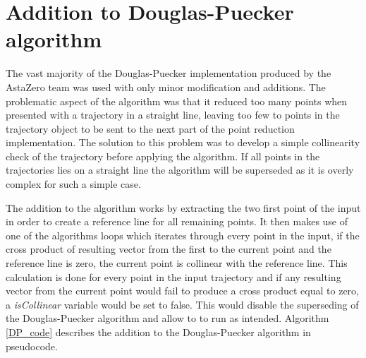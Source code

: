 \section{Addition to Douglas-Puecker algorithm}
\label{sec:alt_douglas_peucker_algo}
The vast majority of the Douglas-Puecker implementation produced by the AstaZero team was used with only minor modification and additions. The problematic aspect of the algorithm was that it reduced too many points when presented with a trajectory in a straight line, leaving too few to points in the trajectory object to be sent to the next part of the point reduction implementation. The solution to this problem was to develop a simple collinearity check of the trajectory before applying the algorithm. If all points in the trajectories lies on a straight line the algorithm will be superseded as it is overly complex for such a simple case. 
\newline

The addition to the algorithm works by extracting the two first point of the input in order to create a reference line for all remaining points. It then makes use of one of the algorithms loops which iterates through every point in the input, if the cross product of resulting vector from the first to the current point and the reference line is zero, the current point is collinear with the reference line. This calculation is done for every point in the input trajectory and if any resulting vector from the current point would fail to produce a cross product equal to zero, a \textit{isCollinear} variable would be set to false. This would disable the superseding of the Douglas-Puecker algorithm and allow to to run as intended. Algorithm \ref{DP_code} describes the addition to the Douglas-Puecker algorithm in pseudocode. 

